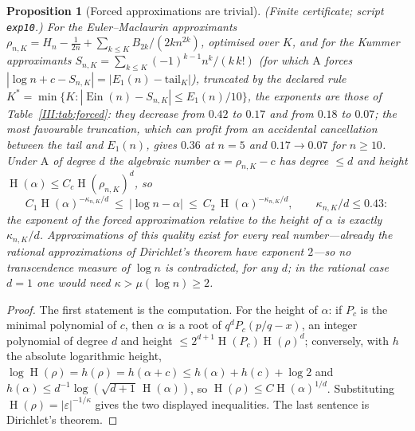 \documentclass[11pt,a4paper]{article}
\newcommand{\Ein}{\operatorname{Ein}}
\DeclareMathOperator{\Ht}{H}
\newtheorem{proposition}[theorem]{Proposition}
\theoremstyle{definition}
\theoremstyle{remark}
\numberwithin{equation}{section}
\begin{document}
\begin{proposition}[Forced approximations are trivial]\label{III:prop:forced}
\textup{(Finite certificate; script \texttt{exp10}.)} For the Euler--Maclaurin approximants
$\rho_{n,K}=H_n-\frac1{2n}+\sum_{k\le K}B_{2k}/(2kn^{2k})$, optimised over $K$, and for
the Kummer approximants $S_{n,K}=\sum_{k\le K}(-1)^{k-1}n^k/(k\,k!)$ (for which $\mathrm A$
forces $|\log n+c-S_{n,K}|=|E_1(n)-\text{tail}_K|$), truncated by the declared rule
$K^*=\min\{K:|\Ein(n)-S_{n,K}|\le E_1(n)/10\}$, the exponents are those of
Table~\ref{III:tab:forced}: they decrease from $0.42$ to $0.17$ and from $0.18$ to $0.07$; the
most favourable truncation, which can profit from an accidental cancellation between the
tail and $E_1(n)$, gives $0.36$ at $n=5$ and $0.17\to0.07$ for $n\ge10$. Under $\mathrm A$
of degree $d$ the algebraic number $\alpha=\rho_{n,K}-c$ has degree $\le d$ and height
$\Ht(\alpha)\le C_c\Ht(\rho_{n,K})^d$, so
\[
 C_1\Ht(\alpha)^{-\kappa_{n,K}/d}\ \le\ |\log n-\alpha|\ \le\ C_2\,\Ht(\alpha)^{-\kappa_{n,K}/d},
 \qquad \kappa_{n,K}/d\le0.43 :
\]
the exponent of the forced approximation relative to the height of $\alpha$ is exactly
$\kappa_{n,K}/d$. Approximations of this quality exist for every real number---already
the rational approximations of Dirichlet's theorem have exponent $2$---so no
transcendence measure of $\log n$ is contradicted, for any $d$; in the rational case
$d=1$ one would need $\kappa>\mu(\log n)\ge2$.
\end{proposition}
\begin{proof}
The first statement is the computation. For the height of $\alpha$: if $P_c$ is the
minimal polynomial of $c$, then $\alpha$ is a root of $q^dP_c(p/q-x)$, an integer
polynomial of degree $d$ and height $\le2^{d+1}\Ht(P_c)\Ht(\rho)^d$; conversely, with
$h$ the absolute logarithmic height, $\log\Ht(\rho)=h(\rho)=h(\alpha+c)\le
h(\alpha)+h(c)+\log2$ and $h(\alpha)\le d^{-1}\log(\sqrt{d+1}\,\Ht(\alpha))$, so
$\Ht(\rho)\le C\Ht(\alpha)^{1/d}$. Substituting $\Ht(\rho)=|\varepsilon|^{-1/\kappa}$
gives the two displayed inequalities. The last sentence is Dirichlet's theorem.
\end{proof}
\end{document}

